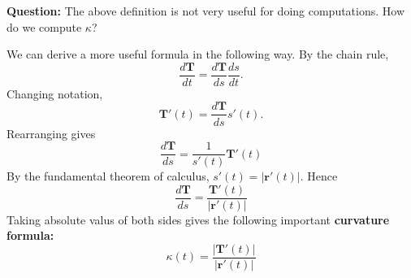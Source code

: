 \documentclass[10pt]{article}
\theoremstyle{definition}
\newcommand{\fl}{\noindent\textbf} %
\newcommand{\1}[1]{\textbf{1}_{\left[#1\right]}} %
\begin{document}
\fl{Question:} The above definition is not very useful for doing computations.
How do we compute $\kappa$?

We can derive a more useful formula in the following way. By the chain rule,
\begin{equation*}
  \frac{d\mathbf{T}}{dt} = \frac{d\mathbf{T}}{ds} \frac{ds}{dt}.
\end{equation*}
Changing notation,
\begin{equation*}
  \mathbf{T}'(t) = \frac{d\mathbf{T}}{ds}s'(t).
\end{equation*}
Rearranging gives
\begin{equation*}
  \frac{d\mathbf{T}}{ds} = \frac{1}{s'(t)} \mathbf{T}'(t)
\end{equation*}
By the fundamental theorem of calculus,
$s'(t) = |\mathbf{r}'(t)|$. Hence
\begin{equation*}
  \frac{d\mathbf{T}}{ds} = \frac{\mathbf{T}'(t)}{|\mathbf{r}'(t)|}
\end{equation*}
Taking absolute valus of both sides gives the following important \textbf{curvature formula:}
\begin{equation}\label{eq:curvature-formula}
  \boxed{\kappa(t) = \frac{|\mathbf{T}'(t)|}{|\mathbf{r}'(t)|}}
\end{equation}
\end{document}
